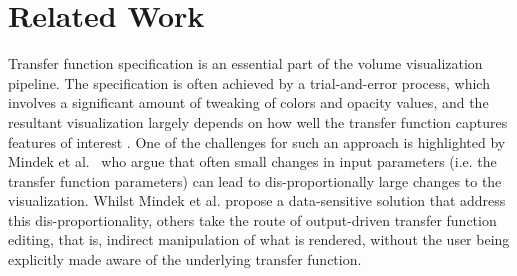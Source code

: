\documentclass[twoside,twocolumn,10pt]{article}
\begin{document}

\section{Related Work}

Transfer function specification is an essential part of the volume visualization pipeline.
The specification is often achieved by a trial-and-error process, which involves a significant amount of tweaking of colors and opacity values, and the resultant visualization largely depends on how well the transfer function captures features of interest \cite{kniss_multidimensional_2002}.
One of the challenges for such an approach is highlighted by Mindek et al.~\cite{mindek_data-sensitive_2017} who argue that often small changes in input parameters (i.e. the transfer function parameters) can lead to dis-proportionally large changes to the visualization. Whilst Mindek et al. propose a data-sensitive solution that address this dis-proportionality, others take the route of output-driven transfer function editing, that is, indirect manipulation of what is rendered, without the user being explicitly made aware of the underlying transfer function.



\end{document}
